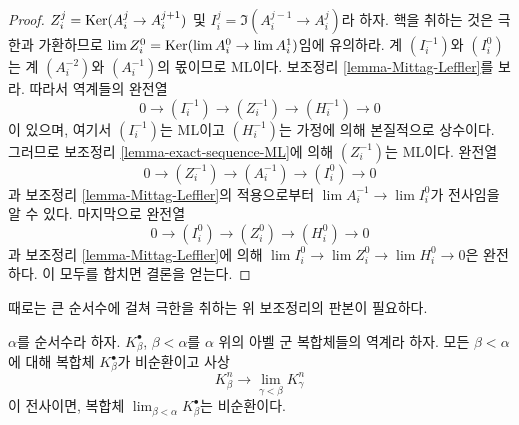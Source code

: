 \begin{proof}
$Z^j_i = \mathop{\mathrm{Ker}}(A^j_i \to A^{j + 1}_i)$ 및
$I^j_i = \Im(A^{j - 1}_i \to A^j_i)$라 하자. 핵을 취하는 것은 극한과
가환하므로 $\mathop{\mathrm{lim}}\nolimits Z^0_i = \mathop{\mathrm{Ker}}(\mathop{\mathrm{lim}}\nolimits A^0_i \to \mathop{\mathrm{lim}}\nolimits A^1_i)$임에 유의하라.
계 $(I^{-1}_i)$와 $(I^0_i)$는 계 $(A^{-2}_i)$와 $(A^{-1}_i)$의
몫이므로 ML이다. 보조정리 \ref{lemma-Mittag-Leffler}를 보라.
따라서 역계들의 완전열
$$
0 \to (I^{-1}_i) \to (Z^{-1}_i) \to (H^{-1}_i) \to 0
$$
이 있으며, 여기서 $(I^{-1}_i)$는 ML이고 $(H^{-1}_i)$는 가정에 의해
본질적으로 상수이다.
그러므로 보조정리 \ref{lemma-exact-sequence-ML}에 의해 $(Z^{-1}_i)$는 ML이다.
완전열
$$
0 \to (Z^{-1}_i) \to (A^{-1}_i) \to (I^0_i) \to 0
$$
과 보조정리 \ref{lemma-Mittag-Leffler}의 적용으로부터
$\lim A^{-1}_i \to \lim I^0_i$가 전사임을 알 수 있다. 마지막으로 완전열
$$
0 \to (I^0_i) \to (Z^0_i) \to (H^0_i) \to 0
$$
과 보조정리 \ref{lemma-Mittag-Leffler}에 의해
$\lim I^0_i \to \lim Z^0_i \to \lim H^0_i \to 0$은 완전하다.
이 모두를 합치면 결론을 얻는다.
\end{proof}

\noindent
때로는 큰 순서수에 걸쳐 극한을 취하는 위 보조정리의 판본이 필요하다.

\begin{lemma}
\label{lemma-ML-over-ordinals}
$\alpha$를 순서수라 하자. $K_\beta^\bullet$, $\beta < \alpha$를
$\alpha$ 위의 아벨 군 복합체들의 역계라 하자. 모든
$\beta < \alpha$에 대해 복합체 $K_\beta^\bullet$가 비순환이고 사상
$$
K^n_\beta \longrightarrow \lim_{\gamma < \beta} K^n_\gamma
$$
이 전사이면, 복합체 $\lim_{\beta < \alpha} K_\beta^\bullet$는
비순환이다.
\end{lemma}

